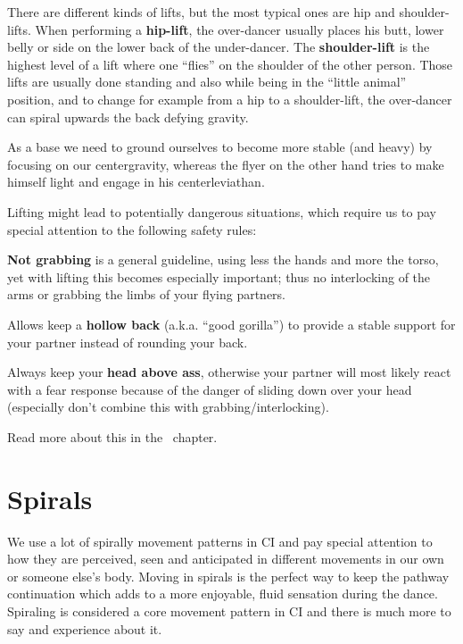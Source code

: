 There are different kinds of lifts, but the most typical ones are hip and shoulder-lifts.
When performing a \textbf{hip-lift}, the \gls{over-dancer} usually places his butt, lower belly or side on the lower back of the \gls{under-dancer}.
The \textbf{shoulder-lift} is the highest level of a lift where one ``flies'' on the shoulder of the other person.
Those lifts are usually done standing and also while being in the ``little animal'' position, and to change for example from a hip to a shoulder-lift, the over-dancer can spiral upwards the back defying gravity.

As a base we need to ground ourselves to become more stable (and heavy) by focusing on our \gls{centergravity},
whereas the flyer on the other hand tries to make himself light and engage in his \gls{centerleviathan}.

Lifting might lead to potentially dangerous situations, which require us to pay special attention to the following safety rules:

\begin{itemize*}
    \item \textbf{Not grabbing} is a general guideline, using less the hands and more the torso, yet with lifting this becomes especially important; thus no interlocking of the arms or grabbing the limbs of your flying partners.
    \item Allows keep a \textbf{hollow back} (a.k.a. ``good gorilla'') to provide a stable support for your partner instead of rounding your back.
    \item Always keep your \textbf{head above ass}, otherwise your partner will most likely react with a fear response because of the danger of sliding down over your head (especially don't combine this with grabbing/interlocking).
\end{itemize*}

Read more about this in the~ chapter.

\section{Spirals}\label{sec:spirals}

We use a lot of spirally movement patterns in CI and pay special attention to how they are perceived, seen and anticipated in different movements in our own or someone else's body.
Moving in spirals is the perfect way to keep the pathway continuation which adds to a more enjoyable, fluid sensation during the dance.
Spiraling is considered a core movement pattern in CI and there is much more to say and experience about it.

